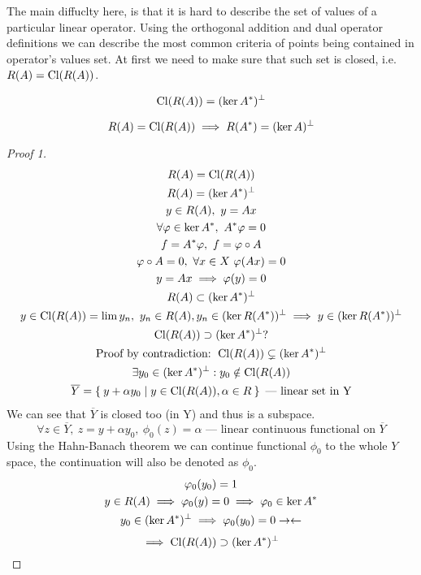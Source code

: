 The main diffuclty here, is that it is hard to describe the set of values of a
particular linear operator.
Using the orthogonal addition and dual operator definitions we can describe the
most common criteria of points being contained in operator's values set. At first we need to
make sure that such set is closed, i.e. $R(A) = \operatorname{Cl}({R(A)})$.

\begin{thm}[1]
  \[
    \operatorname{Cl}({R(A)}) = (\ker{A^*})^\perp
  \]
\end{thm}

\begin{thm}[2]
  \[
    R(A) = \operatorname{Cl}({R(A)}) \implies R(A^*) = (\ker{A})^\perp
  \]
\end{thm}

\begin{proof}[Proof 1]
  \begin{gather*}
    R(A) = \operatorname{Cl}({R(A)}) \\
    R(A) = (\ker{A^*})^\perp \\
    y \in R(A),\ y = Ax \\
    \forall \varphi \in \ker{A^*},\ A^* \varphi = 0 \\
    f = A^* \varphi,\ f = \varphi \circ A \\
    \varphi \circ A = 0,\ \forall x \in X\ \varphi(A x) = 0 \\ 
    y = Ax \implies \varphi(y) = 0 \\
    R(A) \subset (\ker{A^*})^\perp \\
    y \in \operatorname{Cl}({R(A)}) = \lim y_n,\ y_n \in R(A), y_n \in (\ker{R(A^*)})^\perp
    \implies y \in (\ker{R(A^*)})^\perp \\
    \operatorname{Cl}({R(A)}) \supset (\ker{A^*})^\perp ?\\
    \text{Proof by contradiction: } \operatorname{Cl}({R(A)}) \subsetneq (\ker{A^*})^\perp \\
    \exists y_0 \in (\ker{A^*})^\perp : y_0 \notin \operatorname{Cl}({R(A)}) \\
    \overline{Y} = \Set{ y + \alpha y_0 | y \in \operatorname{Cl}({R(A)}), \alpha \in R } \text{ ---
      linear set in Y} 
  \end{gather*}
  We can see that $\overline{Y}$ is closed too (in Y) and thus is a subspace.
  \[
    \forall z \in \overline{Y},\ z = y + \alpha y_0,\ \phi_0(z) = \alpha \text{ --- 
      linear continuous functional on $\overline{Y}$}
  \] 
  Using the Hahn-Banach theorem we can continue functional $\phi_0$ to the whole $Y$ space, the continuation will
  also be denoted as $\phi_0$.
  \begin{gather*}
    \varphi_0(y_0) = 1 \\
    y \in R(A) \implies \varphi_0(y) = 0 \implies \varphi_0 \in \ker{A^*} \\
    y_0 \in (\ker{A^*})^\perp \implies \varphi_0(y_0) = 0 \rightarrow\leftarrow 
  \end{gather*} 
  \[
    \implies \operatorname{Cl}({R(A)}) \supset (\ker{A^*})^\perp \qedhere
  \]
\end{proof}

